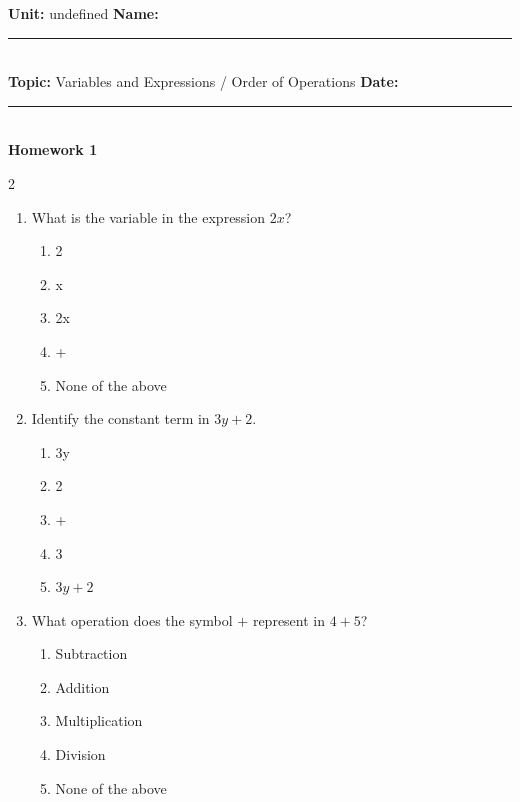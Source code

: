 \documentclass[10pt]{article}
\begin{document}
\enlargethispage{2.5cm}

\begin{tcolorbox}[colback=mainblue!5, colframe=mainblue, sharp corners, boxrule=0.5pt]
    \small \textbf{Unit:} undefined \hfill \textbf{Name:} \rule{3cm}{0.4pt} \\
    \small \textbf{Topic:} Variables and Expressions / Order of Operations \hfill \textbf{Date:} \rule{2cm}{0.4pt} \\
    \centering \textbf{\large Homework 1}
\end{tcolorbox}

\vspace{0.2cm}

\begin{multicols}{2}
\begin{enumerate}[label=\textbf{Q\arabic*.}, leftmargin=*, itemsep=6pt, parsep=0pt]

  \item \small What is the variable in the expression $2x$?
  \begin{enumerate}[label=(\Alph*), leftmargin=0.6cm, nosep, itemsep=2pt]
    \item 2
    \item x
    \item 2x
    \item +
    \item None of the above
  \end{enumerate}

  \item \small Identify the constant term in $3y + 2$.
  \begin{enumerate}[label=(\Alph*), leftmargin=0.6cm, nosep, itemsep=2pt]
    \item 3y
    \item 2
    \item +
    \item 3
    \item $3y + 2$
  \end{enumerate}

  \item \small What operation does the symbol $+$ represent in $4 + 5$?
  \begin{enumerate}[label=(\Alph*), leftmargin=0.6cm, nosep, itemsep=2pt]
    \item Subtraction
    \item Addition
    \item Multiplication
    \item Division
    \item None of the above
  \end{enumerate}


\end{enumerate}
\end{multicols}
\end{document}
